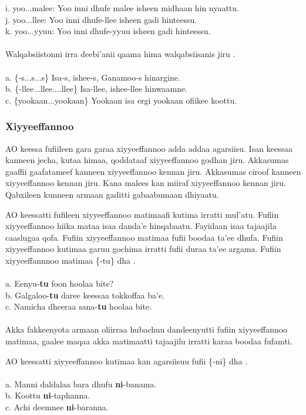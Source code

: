 \documentclass[11pt,b5paper]{book}
\begin{document}
i. yoo...malee: Yoo inni dhufe malee isheen midhaan hin nyaattu.\\
j. yoo...llee: Yoo inni dhufe-llee isheen gadi hinteessu.\\
k. yoo...yyuu: Yoo inni dhufe-yyuu isheen gadi hinteessu. \\
\\
Walqabsiistonni irra deebi’anii qaama hima walqabsiisanis jiru \cite{griefenow2001grammatical}.\\
\\
a. \{-s...s...s\} Isa-s, ishee-s, Ganamoo-s hinargine.\\
b. \{-llee...llee....llee\} Isa-llee, ishee-llee hinwaamne.\\
c. \{yookaan...yookaan\} Yookaan isa ergi yookaan ofiikee koottu.

\subsubsection{Xiyyeeffannoo}

AO keessa fufiileen gara garaa xiyyeeffannoo adda addaa agarsiisu. Isan keessaa kanneen jecha, kutaa himaa, qoddataaf xiyyeeffannoo godhan jiru. Akkasumas gaaffii gaafatameef kanneen xiyyeeffannoo kennan jiru. Akkasumas ciroof kanneen xiyyeeffannoo kennan jiru. Kana malees kan miiraf xiyyeeffannoo kennan jiru. Qabxileen kunneen armaan gaditti gabaabumaan dhiyaatu.

AO keessatti fufileen xiyyeeffannoo matimaafi kutima irratti mul’atu. Fufiin xiyyeeffannoo hiika mataa isaa danda’e
hinqabaatu. Fayidaan isaa tajaajila caaslugaa qofa. Fufiin xiyyeeffannoo matimaa fufii boodaa ta’ee dhufa. Fufiin
xiyyeeffannoo kutimaa garuu gochima irratti fufii duraa ta’ee argama. Fufiin xiyyeeffannnoo matimaa \{-tu\} dha \cite[p.371]{baye1988focus}.\\
\\
a. Eenyu-\textbf{tu} foon hoolaa bite?\\
b. Galgaloo-\textbf{tu} daree keessaa tokkoffaa ba’e.\\
c. Namicha dheeraa sana-\textbf{tu} hoolaa bite. \\
\\
Akka fakkeenyota armaan oliirraa hubachuu dandeenyutti fufiin xiyyeeffannoo matimaa, gaalee maqaa akka matimaatti
tajaajilu irratti karaa boodaa fufamti. 


AO keessatti xiyyeeffannoo kutimaa kan agarsiisuu fufii \{-ni\} dha \cite[p.54]{griefenow2001grammatical}. \\
\\
a. Manni daldalaa bara dhufu \textbf{ni}-banama.\\
b. Koottu \textbf{ni}-taphanna.\\
c. Achi deemnee \textbf{ni}-baranna.\\
\end{document}
